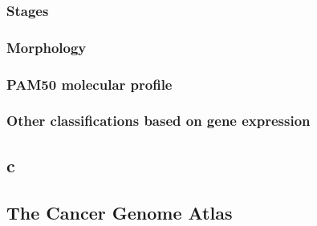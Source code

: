             \subsubsection{Stages}
            \subsubsection{Morphology}
            \subsubsection{PAM50 molecular profile}

            \subsubsection{Other classifications based on gene expression }
         \subsection{c}
        
        
    \subsection{The Cancer Genome Atlas}
